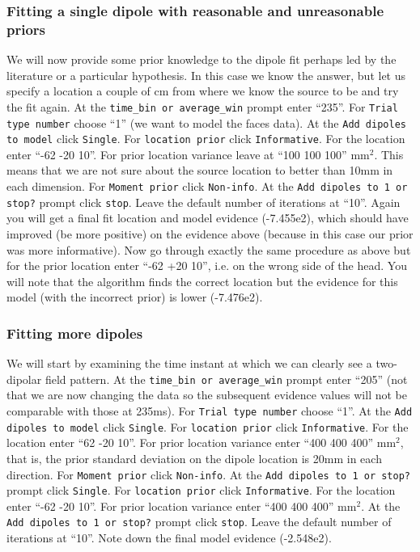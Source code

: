 \subsubsection{Fitting a single dipole with reasonable and unreasonable priors}
We will now provide some prior knowledge to the dipole fit perhaps led by the literature or a particular hypothesis. In this case we know the answer, but let us specify a location a couple of cm from where we know the source to be and try the fit again.
At the  \texttt{time\_bin or average\_win} prompt enter ``235''. For  \texttt{Trial type number} choose ``1'' (we want to model the faces data). At the  \texttt{Add dipoles to model} click  \texttt{Single}. For  \texttt{location prior} click  \texttt{Informative}. For the location enter ``-62 -20 10''. For prior location variance leave at ``100 100 100'' mm$^2$. This means that we are not sure about the source location to better than 10mm in each dimension. For  \texttt{Moment prior} click  \texttt{Non-info}. At the  \texttt{Add dipoles to 1 or stop?} prompt click  \texttt{stop}. Leave the default number of iterations at ``10''. Again you will get a final fit location and model evidence (-7.455e2), which should have improved (be more positive) on the evidence above (because in this case our prior was more informative). 
Now go through exactly the same procedure as above but for the prior location enter ``-62 +20 10'', i.e. on the wrong side of the head. You will note that the algorithm finds the correct location but the evidence for this model (with the incorrect prior) is lower (-7.476e2).

\subsubsection{Fitting more dipoles}
We will start by examining the time instant at which we can clearly see a two-dipolar field pattern.
At the \texttt{time\_bin or average\_win} prompt enter ``205'' (not that we are now changing the data so the subsequent evidence values will not be comparable with those at 235ms). For \texttt{Trial type number} choose ``1''. At the \texttt{Add dipoles to model} click \texttt{Single}. For \texttt{location prior} click \texttt{Informative}. For the location enter ``62 -20 10''. For prior location variance enter ``400 400 400'' mm$^2$, that is, the prior standard deviation on the dipole location is 20mm in each direction. For \texttt{Moment prior} click \texttt{Non-info}. At the \texttt{Add dipoles to 1 or stop?} prompt click \texttt{Single}. For \texttt{location prior} click \texttt{Informative}. For the location enter ``-62 -20 10''. For prior location variance enter ``400 400 400'' mm$^2$. At the \texttt{Add dipoles to 1 or stop?} prompt click \texttt{stop}. Leave the default number of iterations at ``10''. Note down the final model evidence (-2.548e2). 

